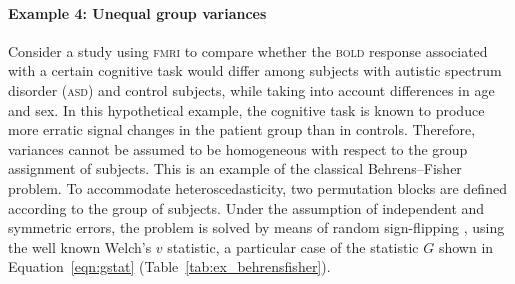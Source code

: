 \paragraph{Example 4: Unequal group variances}  Consider a study using \textsc{fmri} to compare whether the \textsc{bold} response associated with a certain cognitive task would differ among subjects with autistic spectrum disorder (\textsc{asd}) and control subjects, while taking into account differences in age and sex. In this hypothetical example, the cognitive task is known to produce more erratic signal changes in the patient group than in controls. Therefore, variances cannot be assumed to be homogeneous with respect to the group assignment of subjects. This is an example of the classical Behrens--Fisher problem. To accommodate heteroscedasticity, two permutation blocks are defined according to the group of subjects. Under the assumption of independent and symmetric errors, the problem is solved by means of random sign-flipping \citep{Pesarin1995}, using the well known Welch's $v$ statistic, a particular case of the statistic $G$ shown in Equation~\ref{eqn:gstat} (Table~\ref{tab:ex_behrensfisher}).

